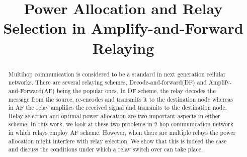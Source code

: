 \documentclass[conference]{IEEEtran}
\begin{document}
%
\title{Power Allocation and Relay Selection in
Amplify-and-Forward Relaying
}


\author{
}






\maketitle

\begin{abstract}
	Multihop communication is considered to be a standard in next generation
	cellular networks.  There are several relaying schemes,
	Decode-and-forward(DF) and Amplify-and-Forward(AF) being the popular ones.
	In DF scheme, the relay decodes the message from the source, re-encodes
	and transmits it to the destination node whereas in AF the relay amplifies
	the received signal and transmits to the destination node. Relay selection
	and optimal power allocation are two important aspects in either
	scheme. In this work, we look at these two problems in 2-hop communication
	network in which relays employ AF scheme. However, when there are multiple
	relays the power allocation might interfere with relay selection. We show
	that this is indeed the case and discuss the conditions under which a relay
	switch over can take place.

\end{abstract}





%
\IEEEpeerreviewmaketitle
\end{document}
